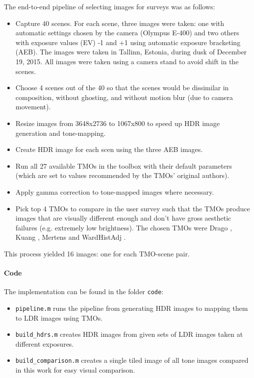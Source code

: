 \documentclass[a4paper]{scrartcl}
\begin{document}
The end-to-end pipeline of selecting images for surveys was as follows:
\begin{itemize}
\item Capture 40 scenes. For each scene, three images were taken: one with automatic settings chosen by the camera (Olympus E-400) and two others with exposure values (EV) -1 and +1 using automatic exposure bracketing (AEB). The images were taken in Tallinn, Estonia, during dusk of December 19, 2015. All images were taken using a camera stand to avoid shift in the scenes.
\item Choose 4 scenes out of the 40 so that the scenes would be dissimilar in composition, without ghosting, and without motion blur (due to camera movement).
\item Resize images from 3648x2736 to 1067x800 to speed up HDR image generation and tone-mapping.
\item Create HDR image for each scen using the three AEB images.
\item Run all 27 available TMOs in the toolbox \cite{Banterle:2011} with their default parameters (which are set to values recommended by the TMOs' original authors).
\item Apply gamma correction to tone-mapped images where necessary.
\item Pick top 4 TMOs to compare in the user survey such that the TMOs produce images that are visually different enough and don't have gross aesthetic failures (e.g. extremely low brightness). The chosen TMOs were Drago \cite{drago2003adaptive}, Kuang \cite{kuang2007icam06}, Mertens \cite{mertens2007exposure} and WardHistAdj \cite{larson1997visibility}.

\end{itemize}

This process yielded 16 images: one for each TMO-scene pair. \\

\paragraph{Code} The implementation can be found in the folder \texttt{code}: 

\begin{itemize} 

\item \verb+pipeline.m+ runs the pipeline from generating HDR images to mapping them to LDR images using TMOs.
\item \verb+build_hdrs.m+ creates HDR images from given sets of LDR images taken at different exposures.
\item \verb+build_comparison.m+ creates a single tiled image of all tone images compared in this work for easy visual comparison.

\end{itemize}
\end{document}
